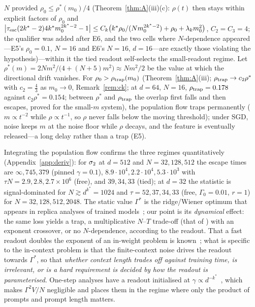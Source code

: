 \begin{proposition}
\begin{enumerate}
$N$ provided $\rho_0\le\rho^*(m_0)/4$ (Theorem~\ref{thm:A}(iii)(c): $\rho(t)$ then stays within explicit factors of $\rho_0$ and $\big|\tau_{\rm esc}(2k^*-2)4k^*m_0^{2k^*-2}-1\big|\le C_k\big(k^*\rho_0/(Nm_0^{2k^*-2})+\rho_0+\lambda_km_0^2\big)$, $C_2=C_3=4$; the qualifier was added after E6, and the two cells where $N$-dependence appeared---E5's $\rho_0=0.1$, $N=16$ and E6's $N=16$, $d=16$---are exactly those violating the hypothesis)---within it the tied readout self-selects the small-readout regime. Let $\rho^*(m)=2Nm^2/\big(4+(N+5)m^2\big)\approx Nm^2/2$ be the value at which the
directional drift vanishes. For $\rho_0>\rho_{\rm trap}(m_0)$ (Theorem~\ref{thm:A}(iii); $\rho_{\rm trap}\to c_2\rho^*$ with $c_2=\tfrac43$ as $m_0\to0$, Remark~\ref{rem:ck}; at $d=64$, $N=16$, $\rho_{\rm trap}=0.178$ against $c_2\rho^*=0.154$; between $\rho^*$ and $\rho_{\rm trap}$ the overlap first
falls and then escapes, proved for the small-$m$ system), the population flow traps permanently ($m\propto t^{-2}$ while $\rho\propto t^{-1}$, so $\rho$ never falls below the
moving threshold); under SGD,
noise keeps $m$ at the noise floor while $\rho$ decays, and the feature is eventually released---a long delay rather than a trap (E5).
\end{enumerate}
\end{proposition}
Integrating the population flow confirms the three regimes quantitatively (Appendix~\ref{app:deriv}): for $\sigma_2$ at $d=512$ and
$N=32,128,512$ the escape times are $\infty,745,379$ (pinned $\gamma=0.1$), $8.9\cdot10^4,2.2\cdot10^4,5.3\cdot10^3$ with $\tau N=2.9,2.8,2.7\times10^6$
(free), and $39,34,33$ (tied); at $d=32$ the statistic is signal-dominated for $N\gtrsim d^{k^*}=1024$ and $\tau=52,37,34,33$ (free, $\Gamma_0=0.01$, $r=1$) for $N=32,128,512,2048$.
The static value $\Gamma^*$ is the ridge/Wiener optimum that appears in replica analyses of trained
models~\citep[eqs.~(297)--(298)]{gu2026incontext}; our point is its \emph{dynamical} effect: the same loss yields a trap, a multiplicative $N$--$T$ trade-off (that of
\citet[Remark~3]{oko2024pretrained}) with an exponent crossover, or no $N$-dependence, according to the readout. That a fast readout doubles the exponent of an in-weight problem is
known~\citep[\S5]{bietti2023learning}; what is specific to the in-context problem is that the finite-context noise drives the
readout towards $\Gamma^*$, so that \emph{whether context length trades off against training time, is irrelevant, or is a
hard requirement is decided by how the readout is parameterised}. One-step analyses have a readout initialised at $\gamma\propto d^{-k^*}$~\citep[Lemma~18]{oko2024pretrained}, which makes $\Gamma^2V/N$
negligible and places them in the regime where only the product of prompts and prompt length matters.

